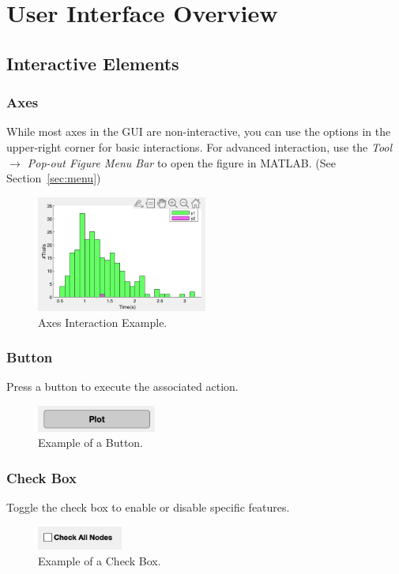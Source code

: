 \chapter{User Interface Overview}

\section{Interactive Elements}
\subsection{Axes}
While most axes in the GUI are non-interactive, you can use the options in the upper-right corner for basic interactions. For advanced interaction, use the \textit{Tool $\rightarrow$ Pop-out Figure Menu Bar} to open the figure in MATLAB. (See Section~\ref{sec:menu})
\begin{figure}[H]
    \centering
    \includegraphics[width=0.5\textwidth]{figs/axes_image.png}
    \caption{Axes Interaction Example.}
    \label{fig:axes}
\end{figure}

\subsection{Button}
Press a button to execute the associated action.
\begin{figure}[H]
    \centering
    \includegraphics[width=0.35\textwidth]{figs/button_image.png}
    \caption{Example of a Button.}
    \label{fig:button}
\end{figure}

\subsection{Check Box}
Toggle the check box to enable or disable specific features.
\begin{figure}[H]
    \centering
    \includegraphics[width=0.25\textwidth]{figs/checkbox_image.png}
    \caption{Example of a Check Box.}
    \label{fig:checkbox}
\end{figure}

